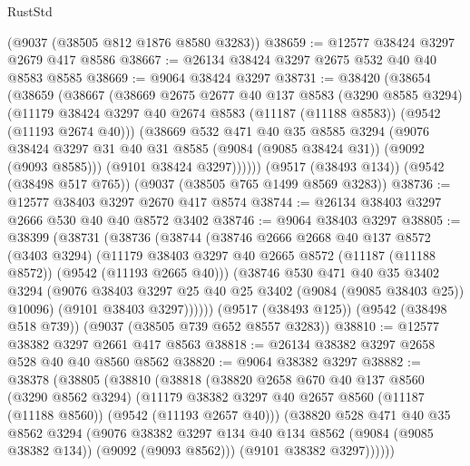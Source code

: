 \begin{lexlean}{RustStd}
\begin{coremodule}
    (@9037 (@38505 @812 @1876 @8580 @3283))
@38659 := @12577 @38424 @3297 @2679 @417 @8586
@38667 := @26134 @38424 @3297 @2675 @532 @40 @40 @8583 @8585
@38669 := @9064 @38424 @3297
@38731 := @38420
    (@38654
      (@38659
        (@38667
          (@38669
            @2675
            @2677
            @40
            @137
            @8583
            (@3290 @8585 @3294)
            (@11179 @38424 @3297 @40 @2674 @8583 (@11187 (@11188 @8583)) (@9542 (@11193 @2674 @40)))
            (@38669
              @532
              @471
              @40
              @35
              @8585
              @3294
              (@9076
                @38424
                @3297
                @31
                @40
                @31
                @8585
                (@9084 (@9085 @38424 @31))
                (@9092 (@9093 @8585)))
              (@9101 @38424 @3297))))))
    (@9517 (@38493 @134))
    (@9542 (@38498 @517 @765))
    (@9037 (@38505 @765 @1499 @8569 @3283))
@38736 := @12577 @38403 @3297 @2670 @417 @8574
@38744 := @26134 @38403 @3297 @2666 @530 @40 @40 @8572 @3402
@38746 := @9064 @38403 @3297
@38805 := @38399
    (@38731
      (@38736
        (@38744
          (@38746
            @2666
            @2668
            @40
            @137
            @8572
            (@3403 @3294)
            (@11179 @38403 @3297 @40 @2665 @8572 (@11187 (@11188 @8572)) (@9542 (@11193 @2665 @40)))
            (@38746
              @530
              @471
              @40
              @35
              @3402
              @3294
              (@9076 @38403 @3297 @25 @40 @25 @3402 (@9084 (@9085 @38403 @25)) @10096)
              (@9101 @38403 @3297))))))
    (@9517 (@38493 @125))
    (@9542 (@38498 @518 @739))
    (@9037 (@38505 @739 @652 @8557 @3283))
@38810 := @12577 @38382 @3297 @2661 @417 @8563
@38818 := @26134 @38382 @3297 @2658 @528 @40 @40 @8560 @8562
@38820 := @9064 @38382 @3297
@38882 := @38378
    (@38805
      (@38810
        (@38818
          (@38820
            @2658
            @670
            @40
            @137
            @8560
            (@3290 @8562 @3294)
            (@11179 @38382 @3297 @40 @2657 @8560 (@11187 (@11188 @8560)) (@9542 (@11193 @2657 @40)))
            (@38820
              @528
              @471
              @40
              @35
              @8562
              @3294
              (@9076
                @38382
                @3297
                @134
                @40
                @134
                @8562
                (@9084 (@9085 @38382 @134))
                (@9092 (@9093 @8562)))
              (@9101 @38382 @3297))))))

\end{coremodule}
\end{lexlean}
